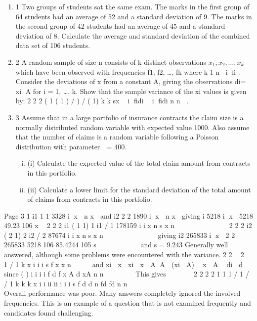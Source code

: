 \documentclass[a4paper,12pt]{article}
\begin{document}
\begin{enumerate}

\item 1 Two groups of students sat the same exam. The marks in the first group of 64 students had an average of 52 and a standard deviation of 9. The marks in the second group of 42 students had an average of 45 and a standard deviation of 8.
Calculate the average and standard deviation of the combined data set of 106 students.

\item 2 A random sample of size n consists of k distinct observations $x_1, x_2, \ldots, x_k$ which have
been observed with frequencies f1, f2, …, fk where k 1
n i fi . Consider the
deviations of x from a constant A, giving the observations di= xi A for i = 1, …, k.
Show that the sample variance of the xi values is given by:
  2 2 2
( 1 ( 1 ) / ) / ( 1) k k
sx  i fidi  i fidi n n  .

\item 3 Assume that in a large portfolio of insurance contracts the claim size is a normally distributed random variable with expected value 1000. Also assume that the number of claims is a random variable following a Poisson distribution with parameter
 = 400.

\begin{enumerate}[(i)]
\item (i) Calculate the expected value of the total claim amount from contracts in this portfolio. 
\item (ii) Calculate a lower limit for the standard deviation of the total amount of claims from contracts in this portfolio. 
\end{enumerate}
\end{enumerate}
\newpage

Page 3
1 i1 1 1 3328
i
x  n x  and i2 2 2 1890
i
x  n x  giving i 5218
i
x 
5218 49.23
106
x 
2
2 2
i1 ( 1 1) 1 i1 / 1 178159
i i
x n s x n
 
    
 
 
2
2 2
i2 ( 2 1) 2 i2 / 2 87674
i i
x n s x n
 
    
 
  giving i2 265833
i
x 
2
2
265833 5218
106
85.4244
105
s
 
  
    and s = 9.243
Generally well answered, although some problems were encountered with the variance.
2 2  2  
1
/ 1
k
x i i
i
s f x x n

  
and xi  x  xi  x  A A  (xi  A)  x  A  di  d
since
( )
i i i i f d f x A
d xA
n n

     
This gives      
2
2 2 2
1 1 1
/ 1 / / 1
k k k
x i i ii ii
i i i
s f d d n fd fd n n
  
                    
  
Overall performance was poor. Many answers completely ignored the involved frequencies.
This is an example of a question that is not examined frequently and candidates found
challenging.
\newpage
\end{document}
